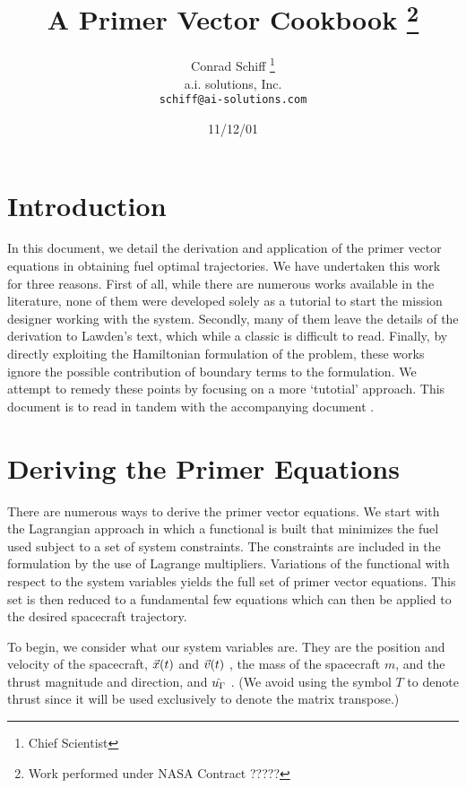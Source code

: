 \documentclass{article}
\newcommand{\scpos}{\ensuremath{\idx{\cv{x}}{(t)}} }
\newcommand{\scvel}{\ensuremath{\idx{\cv{v}}{(t)}} }
\newcommand{\tvec} {\ensuremath{\cuv{\idx{u}{\dn{\gG}}}} }
\begin{document}
\title{A Primer Vector Cookbook \thanks{Work performed under NASA Contract ?????} }
\author{Conrad Schiff \thanks{Chief Scientist} \\
        a.i. solutions, Inc.\\
      \texttt{schiff@ai-solutions.com}}
\date{11/12/01}
\maketitle

%

\section{Introduction}


In this document, we detail the derivation and application of the
primer vector equations in obtaining fuel optimal trajectories. We
have undertaken this work for three reasons.  First of all, while
there are numerous works available in the literature, none of them
were developed solely as a tutorial to start the mission designer
working with the system. Secondly, many of them leave the details
of the derivation to Lawden's text, which while a classic is
difficult to read.  Finally, by directly exploiting the
Hamiltonian formulation of the problem, these works ignore the
possible contribution of boundary terms to the formulation.  We
attempt to remedy these points by focusing on a more `tutotial'
approach.  This document is to read in tandem with the
accompanying document \cite{leonardo}.

\section{Deriving the Primer Equations}\label{derive_primer}

There are numerous ways to derive the primer vector equations.  We
start with the Lagrangian approach in which a functional is built
that minimizes the fuel used subject to a set of system
constraints.  The constraints are included in the formulation by
the use of Lagrange multipliers.  Variations of the functional
with respect to the system variables yields the full set of primer
vector equations.  This set is then reduced to a fundamental few
equations which can then be applied to the desired spacecraft
trajectory.

To begin, we consider what our system variables are.  They are the
position and velocity of the spacecraft, \scpos  and \scvel, the
mass of the spacecraft $m$, and the thrust magnitude and
direction, \gG and \tvec. (We avoid using the symbol $T$ to denote
thrust since it will be used exclusively to denote the matrix
transpose.)
\end{document}
